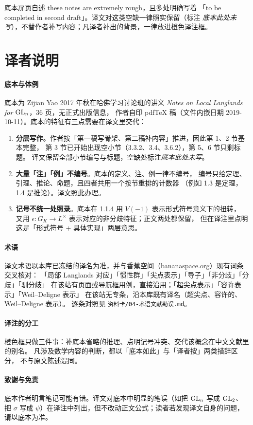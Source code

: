 \begin{yizhu}
底本扉页自述 these notes are extremely rough，且多处明确写着
「to be completed in second draft」。译文对这类空缺一律照实保留（标注
\emph{底本此处未写}），不替作者补写内容；凡译者补出的背景，一律放进橙色译注框。
\end{yizhu}

\section*{译者说明}

\paragraph{底本与体例}
底本为 Zijian Yao 2017 年秋在哈佛学习讨论班的讲义
\emph{Notes on Local Langlands for $\mathrm{GL}_n$}，36 页，无正式出版信息，
作者自印 pdfTeX 稿（文件内嵌日期 2019-10-11）。底本的特征有三点需要在译文里交代：

\begin{enumerate}[leftmargin=2em]
\item \textbf{分层写作}。作者按「第一稿写骨架、第二稿补内容」推进，因此第 1、2 节基本完整，
      第 3 节已开始出现空小节（3.3.2、3.4、3.6.2），第 5、6 节只剩标题。
      译文保留全部小节编号与标题，空缺处标注\emph{底本此处未写}。
\item \textbf{大量「注」「例」不编号}。底本的定义、注、例一律不编号，
      编号只给定理、引理、推论、命题，且四者共用一个按节重排的计数器
      （例如 1.3 是定理，1.4 是推论）。译文照此办理。
\item \textbf{记号不统一处照录}。底本在 1.1.4 用 $V(-1)$ 表示形式符号意义下的扭转，
      又用 $\epsilon: G_K \to L^\times$ 表示对应的非分歧特征；正文两处都保留，
      但在译注里点明这是「形式符号 + 具体实现」两层意思。
\end{enumerate}

\paragraph{术语}
译文术语以本库已冻结的译名为准，并与香蕉空间（bananaspace.org）现有词条交叉核对：
「局部 Langlands 对应」「惯性群」「尖点表示」「导子」「非分歧」「分歧」「驯分歧」
在该站有页面或导航框用例，直接沿用；「超尖点表示」「容许表示」「Weil--Deligne 表示」
在该站无专条，沿本库既有译名（超尖点、容许的、Weil--Deligne 表示）。
逐条对照见 \texttt{资料卡/04-术语文献勘误.md}。

\paragraph{译注的分工}
橙色框只做三件事：补底本省略的推理、点明记号冲突、交代该概念在中文文献里的别名。
凡涉及数学内容的判断，都以「底本如此」与「译者按」两类措辞区分，
不与原文陈述混同。

\paragraph{致谢与免责}
底本作者明言笔记可能有错。译文对底本中明显的笔误（如把 $\mathrm{GL}_n$ 写成 $\mathrm{GL}_2$、
把 $\sigma$ 写成 $\psi$）在译注中列出，但不改动正文公式；读者若发现译文自身的问题，
请以底本为准。
